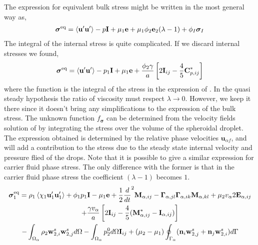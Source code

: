 The expression for equivalent bulk stress might be written in the most general way as, 
\begin{align*}
    \bm{\sigma}^\text{eq}
    = \left<\textbf{u}'\textbf{u}'\right>
    - p \textbf{I}
    + \mu_1 \textbf{e}
    + \mu_1 \phi_2 \textbf{e}_2 (\lambda - 1)
    +\phi_I \bm{\sigma}_I 
\end{align*}
The integral of the internal stress is quite complicated. 
If we discard internal stresses we found, 
\begin{align*}
    \bm{\sigma}^\text{eq}
    = \left<\textbf{u}'\textbf{u}'\right> 
    - p_1 \textbf{I}
    + \mu_1 \textbf{e}
    + \frac{\phi_2 \gamma}{a} \left[
        2 \textbf{I}_{ij} - \frac{4}{5} \textbf{C}_{p,ij}^*
    \right]
\end{align*}
where the function is the integral of the stress in the expression of \citet{taylor1964deformation}. 
In the quasi steady hypothesis the ratio of viscosity must respect $\lambda \to 0$. 
However, we keep it there since it doesn't bring any simplifications to the expression of the bulk stress. 
The unknown function $f_{\bm\sigma}$ can be determined from the velocity fields solution of \citet{taylor1964deformation} by integrating the stress over the volume of the spheroidal droplet. 
The expression obtained is determined by the relative phase velocities $\textbf{u}_{\alpha f}$, and will add a contribution to the stress due to the steady state internal velocity and pressure flied of the drops. 
Note that it is possible to give a similar expression for carrier fluid phase stress. 
The only difference with the former is that in the carrier fluid phase stress the coefficient $(\lambda - 1)$ becomes $1$. 
\begin{multline*}
    \bm{\sigma}^\text{eq}_1 = 
    \rho_1\left<\chi_1\textbf{u}_1'\textbf{u}_1'\right> 
    + \phi_1 p_1 \textbf{I} 
    - \mu_1 \textbf{e} 
    + \frac{1}{2}\frac{d}{dt}^2 \textbf{M}_{\alpha,ij}
    -  \bm\Gamma_{\alpha,jl}\bm\Gamma_{\alpha,ik} \textbf{M}_{\alpha,kl}  
    + \mu_2 v_\alpha 2\textbf{E}_{\alpha,ij}\\
    + \frac{\gamma v_\alpha }{a} \left[
    2\textbf{I}_{ij} 
    - \frac{4 }{5} (\textbf{M}_{\alpha,ij}^* - \textbf{I}_{\alpha,ij})
    \right]\\
    - \int_{\Omega_{\alpha}} \rho_2 \textbf{w}_{2,i}^s\textbf{w}_{2,j}^s d\Omega
    - \int_{\Omega_{\alpha}} p_2^0 d\Omega \textbf{I}_{ij}
    + (\mu_2 - \mu_1)\oint_{\Gamma_{\alpha}} (\textbf{n}_i \textbf{w}_{2,j}^s + \textbf{n}_j \textbf{w}_{2,i}^s) d\Gamma
    \label{eq:Steady_state_bubble}
\end{multline*} 
